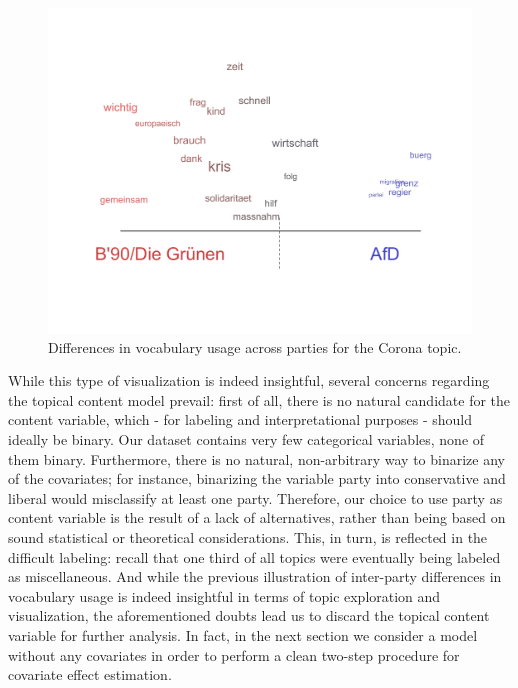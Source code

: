 \begin{figure}[h!]
  \centering
  \captionsetup{justification=centering,margin=2cm}
  \includegraphics[scale = 0.5]{../plots/5_2/t8_vocab_parties.pdf}
  \caption{Differences in vocabulary usage across parties for the Corona topic.}
  \label{fig:t8_vocab_parties}
\end{figure}

While this type of visualization is indeed insightful, several concerns regarding the topical content model prevail: first of all, there is no natural candidate for the content variable, which - for labeling and interpretational purposes - should ideally be binary. Our dataset contains very few categorical variables, none of them binary. Furthermore, there is no natural, non-arbitrary way to binarize any of the covariates; for instance, binarizing the variable party into conservative and liberal would misclassify at least one party. Therefore, our choice to use party as content variable is the result of a lack of alternatives, rather than being based on sound statistical or theoretical considerations. This, in turn, is reflected in the difficult labeling: recall that one third of all topics were eventually being labeled as miscellaneous. And while the previous illustration of inter-party differences in vocabulary usage is indeed insightful in terms of topic exploration and visualization, the aforementioned doubts lead us to discard the topical content variable for further analysis. In fact, in the next section we consider a model without any covariates in order to perform a clean two-step procedure for covariate effect estimation.

